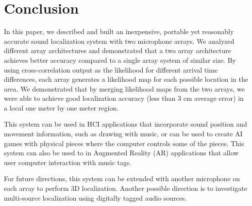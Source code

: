 \chapter{Conclusion}
In this paper, we described and built an inexpensive, portable yet reasonably accurate sound localization system with two microphone arrays. We analyzed different array architectures and demonstrated that a two array architecture achieves better accuracy compared to a single array system of similar size. By using cross-correlation output as the likelihood for different arrival time differences, each array generates a likelihood map for each possible location in the area. We demonstrated that by merging likelihood maps from the two arrays, we were able to achieve good localization accuracy (less than $3$ cm average error) in a local one meter by one meter region.

This system can be used in HCI applications that incorporate sound position and movement information, such as drawing with music, or can be used to create AI games with physical pieces where the computer controls some of the pieces. This system can also be used to in Augmented Reality (AR) applications that allow user computer interaction with music tags.

For future directions, this system can be extended with another microphone on each array to perform 3D localization. Another possible direction is to investigate multi-source localization using digitally tagged audio sources.
